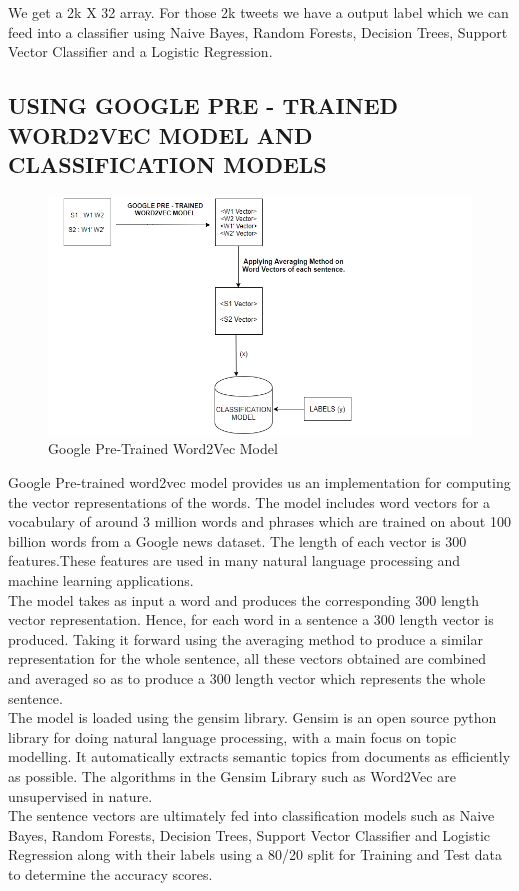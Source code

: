 \documentclass[a4paper,11pt]{article}
\begin{document}
We get a 2k X 32 array. For those 2k tweets we have a output label which we can feed into a classifier using Naive Bayes, Random Forests, Decision Trees, Support Vector Classifier and a Logistic Regression.
\newpage
\subsection{USING GOOGLE PRE - TRAINED WORD2VEC MODEL AND CLASSIFICATION MODELS }
\begin{figure}[ht]
    \centering
    \includegraphics[width=\linewidth]{GooglePre-Trained.png}
    \caption{Google Pre-Trained Word2Vec Model}
    \label{fig:my_label}
\end{figure}

Google Pre-trained word2vec model provides us an implementation for computing the vector representations of the words. The model includes word vectors for a vocabulary of around 3 million words and phrases which are trained on about 100 billion words from a Google news dataset. The length of each vector is 300 features.These features are used in many natural language processing and machine learning applications.
\medskip\\
The model takes as input a word and produces the corresponding 300 length vector representation. Hence, for each word in a sentence a 300 length vector is produced. Taking it forward using the averaging method to produce a similar representation for the whole sentence, all these vectors obtained are combined and averaged so as to produce a 300 length vector which represents the whole sentence.
\medskip\\
The model is loaded using the gensim library. Gensim is an open source python library for doing natural language processing, with a main focus on topic modelling. It automatically extracts semantic topics from documents as efficiently as possible. The algorithms in the Gensim Library such as Word2Vec are unsupervised in nature.
\medskip\\
The sentence vectors are ultimately fed into classification models such as Naive Bayes, Random Forests, Decision Trees, Support Vector Classifier and Logistic Regression along with their labels using a 80/20 split for Training and Test data to determine the accuracy scores.
\end{document}

